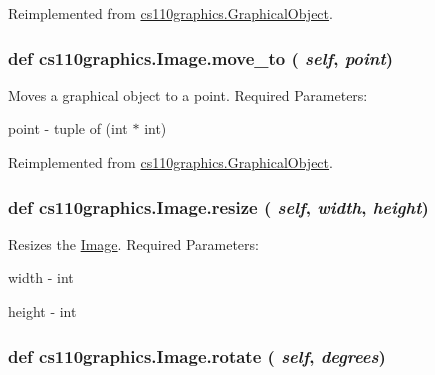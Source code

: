 Reimplemented from \hyperlink{classcs110graphics_1_1GraphicalObject_aa64d270fb83efa4a54e1a7953512f9cd}{cs110graphics.GraphicalObject}.\hypertarget{classcs110graphics_1_1Image_a4b2e775fbb0cb523f6bc09028dc05c65}{
\subsubsection[{move\_\-to}]{\setlength{\rightskip}{0pt plus 5cm}def cs110graphics.Image.move\_\-to ( {\em self}, \/   {\em point})}}
\label{classcs110graphics_1_1Image_a4b2e775fbb0cb523f6bc09028dc05c65}


Moves a graphical object to a point. Required Parameters:
\begin{DoxyItemize}
\item point -\/ tuple of (int $\ast$ int) 
\end{DoxyItemize}

Reimplemented from \hyperlink{classcs110graphics_1_1GraphicalObject_abe2d480265df7ac9447205c52c6946df}{cs110graphics.GraphicalObject}.\hypertarget{classcs110graphics_1_1Image_a0754151035bb2892f0cd3895b64488fa}{
\subsubsection[{resize}]{\setlength{\rightskip}{0pt plus 5cm}def cs110graphics.Image.resize ( {\em self}, \/   {\em width}, \/   {\em height})}}
\label{classcs110graphics_1_1Image_a0754151035bb2892f0cd3895b64488fa}


Resizes the \hyperlink{classcs110graphics_1_1Image}{Image}. Required Parameters:
\begin{DoxyItemize}
\item width -\/ int
\item height -\/ int 
\end{DoxyItemize}\hypertarget{classcs110graphics_1_1Image_ac58717d68279e536cee608e2bdfc6aa8}{
\subsubsection[{rotate}]{\setlength{\rightskip}{0pt plus 5cm}def cs110graphics.Image.rotate ( {\em self}, \/   {\em degrees})}}
\label{classcs110graphics_1_1Image_ac58717d68279e536cee608e2bdfc6aa8}


